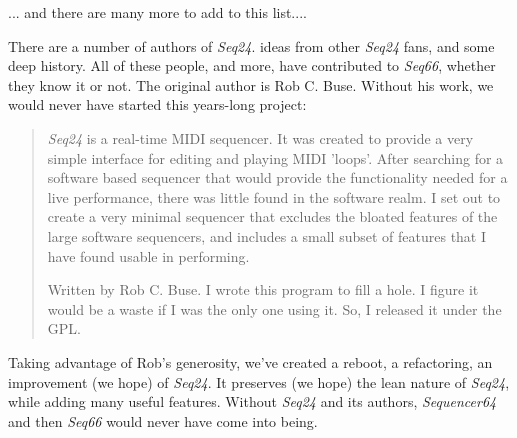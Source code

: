    ... and there are many more to add to this list....

   There are a number of authors of \textsl{Seq24}.
   ideas from other \textsl{Seq24} fans,
   and some deep history.
   All of these people, and more, have contributed to \textsl{Seq66},
   whether they know it or not.
   The original author is Rob C. Buse.
   Without his work, we would never have started this years-long project:

   \begin{quotation}
      \textsl{Seq24} is a real-time MIDI sequencer. It was created to
      provide a very simple interface for editing and playing MIDI 'loops'.
      After searching for a software based sequencer that would provide the
      functionality needed for a live performance, there was little found in
      the software realm. I set out to create a very minimal sequencer that
      excludes the bloated features of the large software sequencers, and
      includes a small subset of features that I have found usable in
      performing. 

      Written by Rob C. Buse.  I wrote this program to fill a
      hole.  I figure it would be a waste if I was the only one
      using it.  So, I released it under the GPL.
   \end{quotation}

   Taking advantage of Rob's generosity,
   we've created a reboot, a refactoring, an improvement (we hope) of
   \textsl{Seq24}.  It preserves (we hope) the lean nature of \textsl{Seq24},
   while adding many useful features.
   Without \textsl{Seq24} and its authors,
   \textsl{Sequencer64} and then \textsl{Seq66} would never have come into
   being.

